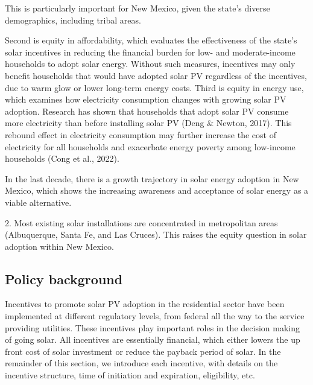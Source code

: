 \documentclass[12pt,twoside,letterpaper]{article}
\begin{document}
 
 This is particularly important for New Mexico, given the state's diverse demographics, including tribal areas. 
 
 
 
 Second is equity in affordability, which evaluates the effectiveness of the state's solar incentives in reducing the financial burden for low- and moderate-income households to adopt solar energy. Without such measures, incentives may only benefit households that would have adopted solar PV regardless of the incentives, due to warm glow or lower long-term energy costs. Third is equity in energy use, which examines how electricity consumption changes with growing solar PV adoption. Research has shown that households that adopt solar PV consume more electricity than before installing solar PV (Deng \& Newton, 2017). This rebound effect in electricity consumption may further increase the cost of electricity for all households and exacerbate energy poverty among low-income households (Cong et al., 2022). 



In the last decade, there is a growth trajectory in solar energy adoption in New Mexico, which shows the increasing awareness and acceptance of solar energy as a viable alternative. 




2. Most existing solar installations are concentrated in metropolitan areas (Albuquerque, Santa Fe, and Las Cruces). This raises the equity question in solar adoption within New Mexico. 






\subsection[Policy background]{Policy background}

Incentives to promote solar PV adoption in the residential sector have been implemented at different regulatory levels, from federal all the way to the service providing utilities. These incentives play important roles in the decision making of going solar. All incentives are essentially financial, which either lowers the up front cost of solar investment or reduce the payback period of solar. In the remainder of this section, we introduce each incentive, with details on the incentive structure, time of initiation and expiration, eligibility, etc. 
\end{document}
